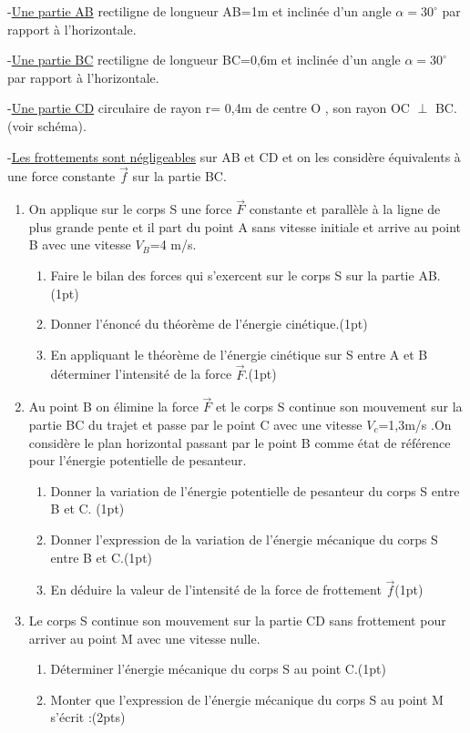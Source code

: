 \documentclass[12pt]{article}
\begin{document}
-\underline{Une partie AB} rectiligne de longueur AB=1m et inclinée d’un angle $\alpha = 30^{\circ}$ par rapport à l’horizontale.

-\underline{Une partie BC} rectiligne de longueur BC=0,6m et inclinée d’un angle $\alpha = 30^{\circ}$ par rapport à l’horizontale.

-\underline{Une partie CD} circulaire de rayon r= 0,4m de centre O , son rayon OC $\perp$ BC. (voir schéma).

-\underline{Les frottements sont négligeables} sur AB et CD et on les considère équivalents à une force constante $\vec{f}$ sur la partie BC.

\begin{enumerate}
    \item On applique sur le corps S une force $\vec{F}$ constante et parallèle à la ligne de plus grande pente et il part du point A sans vitesse initiale et arrive au point B avec une vitesse $V_B$=4 m/s.
        \begin{enumerate}
            \item Faire le bilan des forces qui s’exercent sur le corps S sur la partie AB.\dotfill(1pt)
            \item Donner l’énoncé du théorème de l’énergie cinétique.\dotfill(1pt)
            \item En appliquant le théorème de l’énergie cinétique sur S entre A et B déterminer l’intensité de la force $\vec{F}$.\dotfill(1pt)
        \end{enumerate}
        \item Au point B on élimine la force $\vec{F}$ et le corps S continue son mouvement sur la partie BC du trajet et passe par le point C avec une vitesse $V_c$=1,3m/s .On considère le plan horizontal passant par le point B comme état de référence pour l’énergie potentielle de pesanteur.
            \begin{enumerate}
                \item  Donner la variation de l’énergie potentielle de pesanteur du corps S entre B et C. \dotfill(1pt)
                \item Donner l’expression de la variation de l’énergie mécanique du corps S entre B et C.\dotfill(1pt)
                \item En déduire la valeur de l’intensité de la force de frottement $\vec{f}$\dotfill(1pt)
            \end{enumerate}

            \item Le corps S continue son mouvement sur la partie CD sans frottement pour arriver au point M avec une vitesse nulle.
                \begin{enumerate}
                    \item Déterminer l’énergie mécanique du corps S au point C.\dotfill(1pt)
                    \item Monter que l’expression de l’énergie mécanique du corps S au point M s’écrit :\dotfill(2pts)


\end{enumerate}
\end{enumerate}
\end{document}
